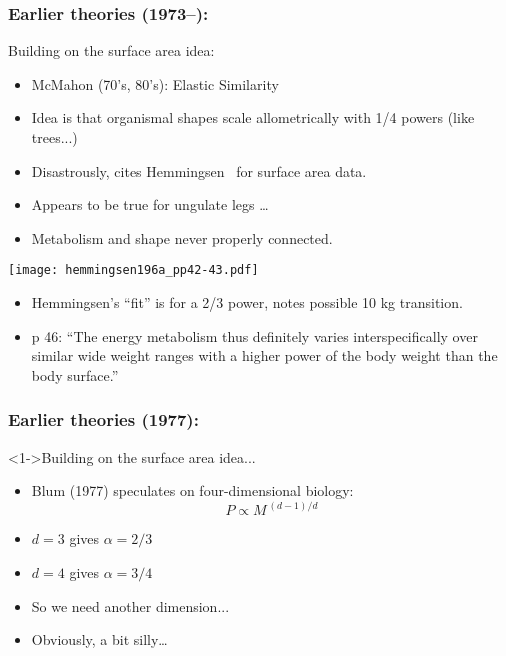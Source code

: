 \begin{frame}
  \frametitle{Earlier theories (1973--):}

  \begin{block}{Building on the surface area idea:}
    \begin{itemize}
    \item<+-> 
      McMahon (70's, 80's): Elastic Similarity\cite{mcmahon1973a,mcmahon1983a}
    \item<+-> 
      Idea is that organismal shapes scale allometrically
      with 1/4 powers {\small (like trees...)}
    \item<+-> 
      Disastrously, cites Hemmingsen~\cite{hemmingsen1960a} for
      surface area data.
    \item<+-> 
      Appears to be true for ungulate legs \ldots\cite{mcmahon1975b}
    \item<+-> 
      Metabolism and shape never properly connected.
    \end{itemize}
  \end{block}

\end{frame}


\begin{frame}

  \begin{center}
    \texttt{[image: hemmingsen196a\_pp42-43.pdf]}    
  \end{center}

  \begin{itemize}
  \item 
    Hemmingsen's ``fit'' is for a 2/3 power, notes possible 10 kg transition.~\cite{hemmsingsen1960a}
  \item 
    p 46: ``The energy metabolism thus definitely varies interspecifically
    over similar wide weight ranges with a higher power of the body
    weight than the body surface.'' 
  \end{itemize}

\end{frame}

\begin{frame}
  \frametitle{Earlier theories (1977):}

  \begin{block}<1->{Building on the surface area idea...}
    \begin{itemize}
    \item<1->
      Blum (1977)\cite{blum1977a} speculates on four-dimensional biology:
      $$P \propto M^{\, (d-1)/d}$$
    \item<2->
      $d=3$ gives $\alpha = 2/3$
    \item<3->
      $d=4$ gives $\alpha = 3/4$
    \item<4-> 
      So we need another dimension...
    \item<5->
      Obviously, a bit silly\ldots\cite{speakman1990a}
    \end{itemize}
  \end{block}

\end{frame}


